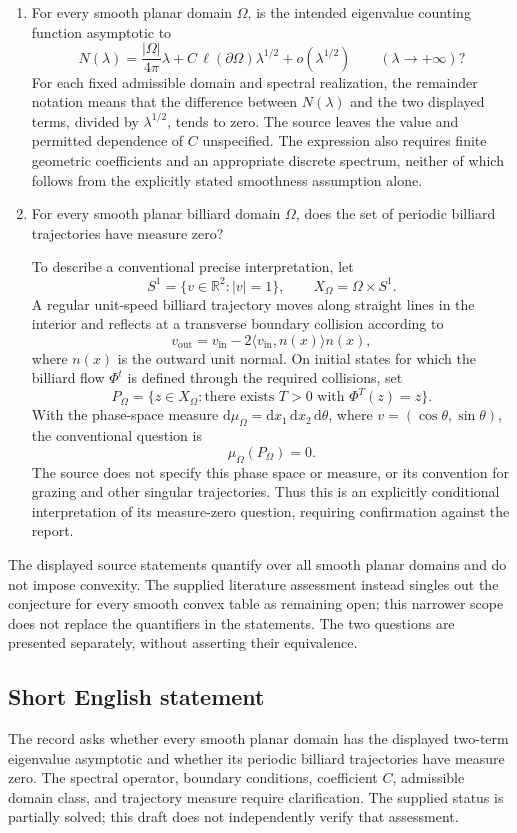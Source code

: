 \documentclass[11pt]{article}
\newcommand{\R}{\mathbb{R}}
\begin{document}
\begin{enumerate}
\item For every smooth planar domain \(\Omega\), is the intended eigenvalue counting function asymptotic to
\[
N(\lambda)=\frac{|\Omega|}{4\pi}\lambda
+C\,\ell(\partial\Omega)\lambda^{1/2}
+o(\lambda^{1/2})
\qquad(\lambda\to+\infty)?
\]
For each fixed admissible domain and spectral realization, the remainder notation means that the difference between \(N(\lambda)\) and the two displayed terms, divided by \(\lambda^{1/2}\), tends to zero. The source leaves the value and permitted dependence of \(C\) unspecified. The expression also requires finite geometric coefficients and an appropriate discrete spectrum, neither of which follows from the explicitly stated smoothness assumption alone.

\item For every smooth planar billiard domain \(\Omega\), does the set of periodic billiard trajectories have measure zero?

To describe a conventional precise interpretation, let
\[
S^1=\{v\in\R^2:|v|=1\},\qquad X_\Omega=\Omega\times S^1.
\]
A regular unit-speed billiard trajectory moves along straight lines in the interior and reflects at a transverse boundary collision according to
\[
v_{\mathrm{out}}=v_{\mathrm{in}}-2\langle v_{\mathrm{in}},n(x)\rangle n(x),
\]
where \(n(x)\) is the outward unit normal. On initial states for which the billiard flow \(\Phi^t\) is defined through the required collisions, set
\[
P_\Omega=\{z\in X_\Omega:\text{there exists }T>0\text{ with }\Phi^T(z)=z\}.
\]
With the phase-space measure \(\mathrm d\mu_\Omega=\mathrm dx_1\,\mathrm dx_2\,\mathrm d\theta\), where \(v=(\cos\theta,\sin\theta)\), the conventional question is
\[
\mu_\Omega(P_\Omega)=0.
\]
The source does not specify this phase space or measure, or its convention for grazing and other singular trajectories. Thus this is an explicitly conditional interpretation of its measure-zero question, requiring confirmation against the report.
\end{enumerate}

The displayed source statements quantify over all smooth planar domains and do not impose convexity. The supplied literature assessment instead singles out the conjecture for every smooth convex table as remaining open; this narrower scope does not replace the quantifiers in the statements. The two questions are presented separately, without asserting their equivalence.
\subsection{Short English statement}
The record asks whether every smooth planar domain has the displayed two-term eigenvalue asymptotic and whether its periodic billiard trajectories have measure zero. The spectral operator, boundary conditions, coefficient \(C\), admissible domain class, and trajectory measure require clarification. The supplied status is partially solved; this draft does not independently verify that assessment.
\end{document}
